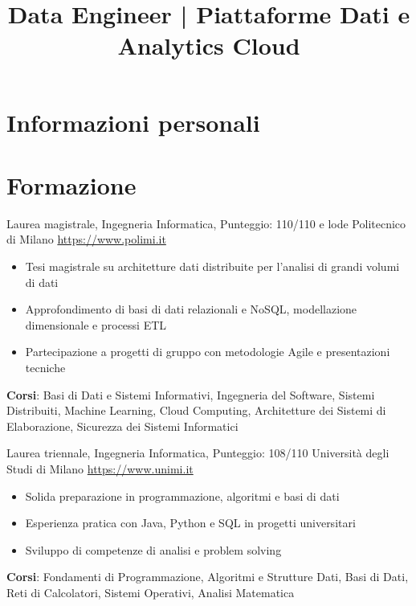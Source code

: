 \documentclass[a4paper, serif, 10pt]{moderncv}
\title{Data Engineer | Piattaforme Dati e Analytics Cloud}
\begin{document}
\maketitle

\section{Informazioni personali}

\section{Formazione}

        {Laurea magistrale, Ingegneria Informatica, Punteggio: 110/110 e lode}
        {Politecnico di Milano}
        {\url{https://www.polimi.it}}
        {}
        {\begin{itemize}
\item Tesi magistrale su architetture dati distribuite per l'analisi di grandi volumi di dati
\item Approfondimento di basi di dati relazionali e NoSQL, modellazione dimensionale e processi ETL
\item Partecipazione a progetti di gruppo con metodologie Agile e presentazioni tecniche
\end{itemize}
\textbf{Corsi}: Basi di Dati e Sistemi Informativi, Ingegneria del Software, Sistemi Distribuiti, Machine Learning, Cloud Computing, Architetture dei Sistemi di Elaborazione, Sicurezza dei Sistemi Informatici}

        {Laurea triennale, Ingegneria Informatica, Punteggio: 108/110}
        {Università degli Studi di Milano}
        {\url{https://www.unimi.it}}
        {}
        {\begin{itemize}
\item Solida preparazione in programmazione, algoritmi e basi di dati
\item Esperienza pratica con Java, Python e SQL in progetti universitari
\item Sviluppo di competenze di analisi e problem solving
\end{itemize}
\textbf{Corsi}: Fondamenti di Programmazione, Algoritmi e Strutture Dati, Basi di Dati, Reti di Calcolatori, Sistemi Operativi, Analisi Matematica}
\end{document}
